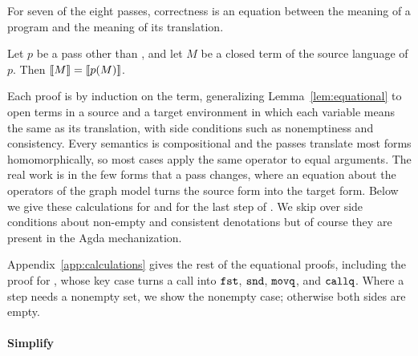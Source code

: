 For seven of the eight passes, correctness is an equation between the
meaning of a program and the meaning of its translation.

\begin{lemma}\label{lem:equational}
Let $p$ be a pass other than , and let $M$ be a
closed term of the source language of $p$. Then
$\llbracket M \rrbracket = \llbracket p(M) \rrbracket$.
\end{lemma}

Each proof is by induction on the term, generalizing
Lemma~\ref{lem:equational} to open terms in a source and a target
environment in which each variable means the same as its translation,
with side conditions such as nonemptiness and consistency. Every
semantics is compositional and the passes translate most forms
homomorphically, so most cases apply the same operator to equal
arguments. The real work is in the few forms that a pass changes,
where an equation about the operators of the graph model turns the
source form into the target form. Below we give these calculations for
 and for the last step of . We skip over
side conditions about non-empty and consistent denotations but of
course they are present in the Agda mechanization.

Appendix~\ref{app:calculations} gives the rest of the equational
proofs, including the proof for , whose key
case turns a call into $\mathtt{fst}$, $\mathtt{snd}$, $\mathtt{movq}$, and
$\mathtt{callq}$.  Where a step needs a nonempty set, we show the nonempty
case; otherwise both sides are empty.

\paragraph{Simplify}

